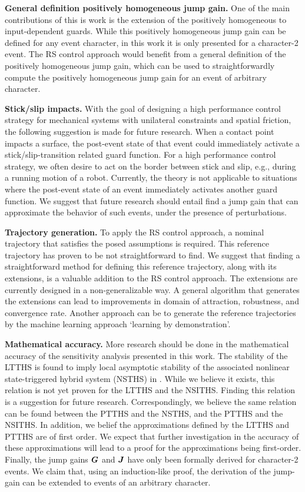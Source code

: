 \documentclass[../DC2017114Bouma.tex]{subfiles}
\begin{document}
\textbf{General definition positively homogeneous jump gain.} One of the main contributions of this is work is the extension of the positively homogeneous to input-dependent guards. While this positively homogeneous jump gain can be defined for any event character, in this work it is only presented for a character-2 event. The RS control approach would benefit from a general definition of the positively homogeneous jump gain, which can be used to straightforwardly compute the positively homogeneous jump gain for an event of arbitrary character.

\textbf{Stick/slip impacts.} With the goal of designing a high performance control strategy for mechanical systems with unilateral constraints and spatial friction, the following suggestion is made for future research. When a contact point impacts a surface, the post-event state of that event could immediately activate a stick/slip-transition related guard function. For a high performance control strategy, we often desire to act on the border between stick and slip, e.g., during a running motion of a robot. Currently, the theory is not applicable to situations where the post-event state of an event immediately activates another guard function. We suggest that future research should entail find a jump gain that can approximate the behavior of such events, under the presence of perturbations.

\textbf{Trajectory generation.} To apply the RS control approach, a nominal trajectory that satisfies the posed assumptions is required. This reference trajectory has proven to be not straightforward to find. We suggest that finding a straightforward method for defining this reference trajectory, along with its extensions, is a valuable addition to the RS control approach. The extensions are currently designed in a non-generalizable way. A general algorithm that generates the extensions can lead to improvements in domain of attraction, robustness, and convergence rate. Another approach can be to generate the reference trajectories by the machine learning approach `learning by demonstration'.

\textbf{Mathematical accuracy.} More research should be done in the mathematical accuracy of the sensitivity analysis presented in this work. The stability of the LTTHS is found to imply local asymptotic stability of the associated nonlinear state-triggered hybrid system (NSTHS) in \cite{Rijnen2017}. While we believe it exists, this relation is not yet proven for the LTTHS and the NSITHS. Finding this relation is a suggestion for future research. Correspondingly, we believe the same relation can be found between the PTTHS and the NSTHS, and the PTTHS and the NSITHS. In addition, we belief the approximations defined by the LTTHS and PTTHS are of first order. We expect that further investigation in the accuracy of these approximations will lead to a proof for the approximations being first-order. Finally, the jump gains ${\boldsymbol{G}}$ and ${\boldsymbol{J}}$ have only been formally derived for character-2 events. We claim that, using an induction-like proof, the derivation of the jump-gain can be extended to events of an arbitrary character.
\end{document}
